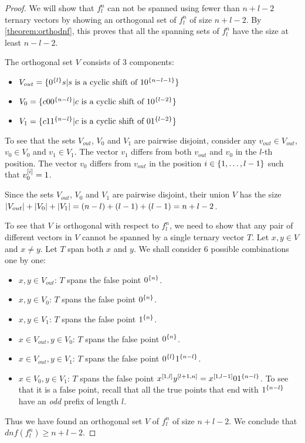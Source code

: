 \begin{proof}
We will show that $f_l^n$ can not be spanned
using fewer than $n+l-2$ ternary vectors
by showing an orthogonal set of $f_l^n$ of size $n+l-2$.
By \autoref{theorem:orthodnf},
this proves that all the spanning sets of $f_l^n$
have the size at least $n-l-2$.

The orthogonal set $V$ consists of 3 components:
\begin{itemize}
\item
$V_{out} = \{0^{\{l\}} s
| s \text{ is a cyclic shift of } 1 0^{\{n-l-1\}}\}$
\item
$V_0 = \{c 0 0^{\{n-l\}}
| c \text{ is a cyclic shift of } 1 0^{\{l-2\}}\}$
\item
$V_1 = \{c 1 1^{\{n-l\}}
| c \text{ is a cyclic shift of } 0 1^{\{l-2\}}\}$
\end{itemize}

To see that the sets $V_{out}$, $V_0$ and $V_1$
are pairwise disjoint,
consider any $v_{out} \in V_{out}$,
$v_0 \in V_0$ and $v_1 \in V_1$.
The vector $v_1$ differs from both $v_{out}$ and $v_0$
in the $l$-th position.
The vector $v_0$ differs from $v_{out}$
in the position $i \in \{1, \ldots, l-1\}$
such that $v_0^{[i]} = 1$.

Since the sets $V_{out}$, $V_0$ and $V_1$
are pairwise disjoint,
their union $V$
has the size
$\lvert V_{out}\rvert + \lvert V_0\rvert + \lvert V_1\rvert
= (n-l) + (l-1) + (l-1) = n+l-2$.

To see that $V$ is orthogonal with respect to $f^n_l$,
we need to show that any pair of different vectors in $V$
cannot be spanned by a single ternary vector $T$.
Let $x,y \in V$ and $x \neq y$.
Let $T$ span both $x$ and $y$.
We shall consider 6 possible combinations one by one:
\begin{itemize}
\item $x,y \in V_{out}$:
$T$ spans the false point $0^{\{n\}}$.
\item $x,y \in V_0$:
$T$ spans the false point $0^{\{n\}}$.
\item $x,y \in V_1$:
$T$ spans the false point $1^{\{n\}}$.
\item $x \in V_{out}, y \in V_0$:
$T$ spans the false point $0^{\{n\}}$.
\item $x \in V_{out}, y \in V_1$:
$T$ spans the false point $0^{\{l\}} 1^{\{n-l\}}$.
\item $x \in V_0, y \in V_1$:
$T$ spans the false point
$x^{[1, l]} y^{[l+1, n]}
= x^{[1, l-1]} 0 1^{\{n-l\}}$.
To see that it is a false point,
recall that
all the true points that end with $1^{\{n-l\}}$
have an \emph{odd} prefix of length $l$.
\end{itemize}

Thus we have found an orthogonal set $V$ of $f_l^n$
of size $n+l-2$.
We conclude that $dnf(f_l^n) \geq n+l-2$.
\end{proof}

